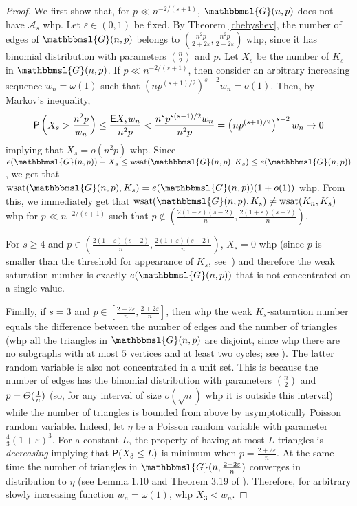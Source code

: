 \documentclass[hidelinks, 11pt]{article}
\theoremstyle{plain}
\theoremstyle{definition}
\begin{document}
\begin{proof}
We first show that, for $p\ll n^{-2/(s+1)}$,   $\mathbbmsl{G}(n,p)$ does not have $\mathcal{A}_s$ whp. Let $\varepsilon\in(0,1)$ be fixed. By   Theorem \ref{chebyshev}, the number of edges of $\mathbbmsl{G}(n,p)$ belongs to $(\tfrac{n^2p}{2+2\varepsilon},\tfrac{n^2p}{2-2\varepsilon})$  whp,   since it has binomial distribution with parameters ${n\choose 2}$ and $p$.
Let $X_s$ be the number of $K_s$  in $\mathbbmsl{G}(n,p)$. If $p\ll n^{-2/(s+1)}$, then consider an arbitrary increasing sequence $w_n=\omega(1)$ such that $(np^{(s+1)/2})^{s-2}w_n=o(1)$. Then, by Markov's inequality, 
$$
{\sf P}\left(X_s>\frac{n^2p}{w_n}\right)\leq\frac{{\sf E}X_sw_n}{n^2p}<\frac{n^sp^{s(s-1)/2}w_n}{n^2p}=\left(np^{(s+1)/2}\right)^{s-2}w_n\to 0
$$
implying that $X_s=o(n^2p)$ whp. Since $e(\mathbbmsl{G}(n, p))-X_s\leq\mathrm{wsat}(\mathbbmsl{G}(n, p), K_s)\leq e(\mathbbmsl{G}(n, p))$, we get that  $\mathrm{wsat}(\mathbbmsl{G}(n, p), K_s)=e(\mathbbmsl{G}(n, p))(1+o(1))$ whp. From this, we immediately get that   $\mathrm{wsat}(\mathbbmsl{G}(n, p), K_s)\neq\mathrm{wsat}(K_n, K_s)$ whp for $p\ll n^{-2/(s+1)}$ such that $p\notin\left(\tfrac{2(1-\varepsilon)(s-2)}{n},\tfrac{2(1+\varepsilon)(s-2)}{n}\right)$. 

For $s\geq 4$ and $p\in\left(\tfrac{2(1-\varepsilon)(s-2)}{n},\tfrac{2(1+\varepsilon)(s-2)}{n}\right)$,  $X_s=0$ whp (since $p$ is smaller than the threshold for appearance of $K_s$, see~\cite[Theorem 3.4]{RG}) and  therefore  the weak saturation number is exactly $e(\mathbbmsl{G}(n, p))$ that is not concentrated on a single value. 

Finally, if $s=3$ and $p\in\left[\tfrac{2-2\varepsilon}{n}, \tfrac{2+2\varepsilon}{n}\right]$, then whp   the weak $K_s$-saturation number equals the difference between the number of edges and the number of triangles  (whp all the triangles in $\mathbbmsl{G}(n, p)$ are disjoint,  since whp there are no subgraphs with at most $5$ vertices and at least two cycles; see \cite[Theorem 3.4]{RG}). The latter random variable is also not concentrated in a unit set. This is because the number of edges has the binomial distribution with parameters ${n\choose 2}$ and $p=\mathnormal{\Theta}(\tfrac{1}{n})$ (so,
for any interval of size $o(\sqrt{n})$ whp it is outside this interval) while the number of triangles is bounded from above by asymptotically Poisson random variable. Indeed, let $\eta$ be a Poisson random variable with parameter $\frac{4}{3}(1+\varepsilon)^3$. For a constant $L$, the property of having at most $L$ triangles is {\sl decreasing} \cite[Chapter 1.3]{RG} implying that ${\sf P}(X_3\leq L)$ is minimum when $p=\frac{2+2\varepsilon}{n}$. At the same time the number of  triangles in $\mathbbmsl{G}(n, \tfrac{2+2\varepsilon}{n})$ converges in distribution to $\eta$ (see Lemma 1.10 and Theorem 3.19 of \cite{RG}). Therefore, for arbitrary slowly increasing function $w_n=\omega(1)$, whp $X_3<w_n$.


\end{proof}
\end{document}
